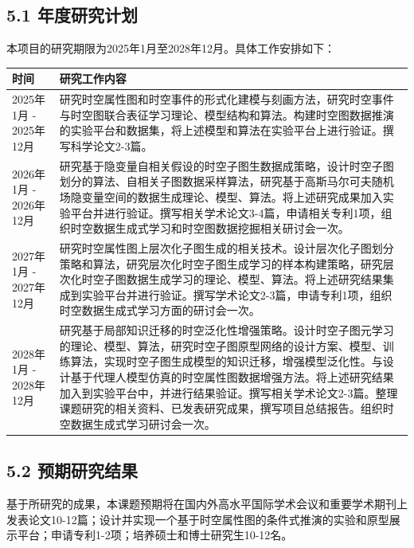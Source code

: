 \documentclass[12pt,UTF8,AutoFakeBold=2,a4paper]{ctexart} %
\begin{document}
\subsection{5.1 年度研究计划}
本项目的研究期限为2025年1月至2028年12月。具体工作安排如下：
%
\begin{table}[h!]
    \centering
    \begin{tabular}{|p{2.5cm}|p{11.5cm}|}
        \hline
        时间 & 研究工作内容\\\hline
        2025年1月 - 2025年12月 & 研究时空属性图和时空事件的形式化建模与刻画方法，研究时空事件与时空图联合表征学习理论、模型结构和算法。构建时空图数据推演的实验平台和数据集，将上述模型和算法在实验平台上进行验证。撰写科学论文2-3篇。\\\hline
        2026年1月 - 2026年12月 & 研究基于隐变量自相关假设的时空子图生数据成策略，设计时空子图划分的算法、自相关子图数据采样算法，研究基于高斯马尔可夫随机场隐变量空间的数据生成理论、模型、算法。将上述研究成果加入实验平台并进行验证。撰写相关学术论文3-4篇，申请相关专利1项，组织时空数据生成式学习和时空图数据挖掘相关研讨会一次。\\\hline
         2027年1月 - 2027年12月& 研究时空属性图上层次化子图生成的相关技术。设计层次化子图划分策略和算法，研究层次化时空子图生成学习的样本构建策略，研究层次化时空子图数据生成学习的理论、模型、算法。将上述研究结果集成到实验平台并进行验证。撰写学术论文2-3篇，申请专利1项，组织时空数据生成式学习方面的研讨会一次。\\\hline
         2028年1月 - 2028年12月& 研究基于局部知识迁移的时空泛化性增强策略。设计时空子图元学习的理论、模型、算法，研究时空子图原型网络的设计方案、模型、训练算法，实现时空子图生成模型的知识迁移，增强模型泛化性。与设计基于代理人模型仿真的时空属性图数据增强方法。将上述研究结果加入到实验平台中，并进行结果验证。撰写相关学术论文2-3篇。整理课题研究的相关资料、已发表研究成果，撰写项目总结报告。组织时空数据生成式学习研讨会一次。\\\hline
    \end{tabular}
    \label{tab:timeline}
\end{table}
\vskip -5mm %

\subsection{5.2 预期研究结果}
基于所研究的成果，本课题预期将在国内外高水平国际学术会议和重要学术期刊上
发表论文10-12篇；设计并实现一个基于时空属性图的条件式推演的实验和原型展示平台；申请专利1-2项；培养硕士和博士研究生10-12名。
%
\end{document}
